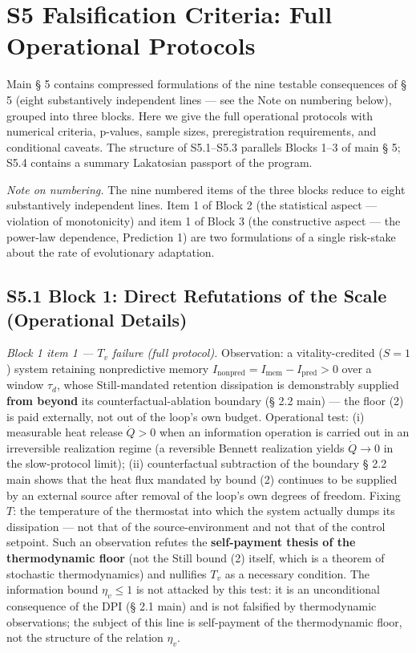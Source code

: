 \documentclass[pdflatex,sn-mathphys-ay]{sn-jnl}
\begin{document}
\section*{S5 Falsification Criteria: Full Operational Protocols}\label{s5-falsification-criteria-full-operational-protocols}

Main § 5 contains compressed formulations of the nine testable consequences of § 5 (eight substantively independent lines --- see the Note on numbering below), grouped into three blocks. Here we give the full operational protocols with numerical criteria, p-values, sample sizes, preregistration requirements, and conditional caveats. The structure of S5.1--S5.3 parallels Blocks 1--3 of main § 5; S5.4 contains a summary Lakatosian passport of the program.

\emph{Note on numbering.} The nine numbered items of the three blocks reduce to eight substantively independent lines. Item 1 of Block 2 (the statistical aspect --- violation of monotonicity) and item 1 of Block 3 (the constructive aspect --- the power-law dependence, Prediction 1) are two formulations of a single risk-stake about the rate of evolutionary adaptation.

\subsection*{S5.1 Block 1: Direct Refutations of the Scale (Operational Details)}\label{s5.1-block-1-direct-refutations-of-the-scale-operational-details}

\emph{Block 1 item 1 --- \(T_v\) failure (full protocol).} Observation: a vitality-credited (\(S = 1\)) system retaining nonpredictive memory \(I_{\text{nonpred}} = I_{\text{mem}} - I_{\text{pred}} > 0\) over a window \(\tau_d\), whose Still-mandated retention dissipation is demonstrably supplied \textbf{from beyond} its counterfactual-ablation boundary (§ 2.2 main) --- the floor (2) is paid externally, not out of the loop's own budget. Operational test: (i) measurable heat release \(\dot Q > 0\) when an information operation is carried out in an irreversible realization regime (a reversible Bennett realization yields \(\dot Q \to 0\) in the slow-protocol limit); (ii) counterfactual subtraction of the boundary § 2.2 main shows that the heat flux mandated by bound (2) continues to be supplied by an external source after removal of the loop's own degrees of freedom. Fixing \(T\): the temperature of the thermostat into which the system actually dumps its dissipation --- not that of the source-environment and not that of the control setpoint. Such an observation refutes the \textbf{self-payment thesis of the thermodynamic floor} (not the Still bound (2) itself, which is a theorem of stochastic thermodynamics) and nullifies \(T_v\) as a necessary condition. The information bound \(\eta_v \le 1\) is not attacked by this test: it is an unconditional consequence of the DPI (§ 2.1 main) and is not falsified by thermodynamic observations; the subject of this line is self-payment of the thermodynamic floor, not the structure of the relation \(\eta_v\).
\end{document}
